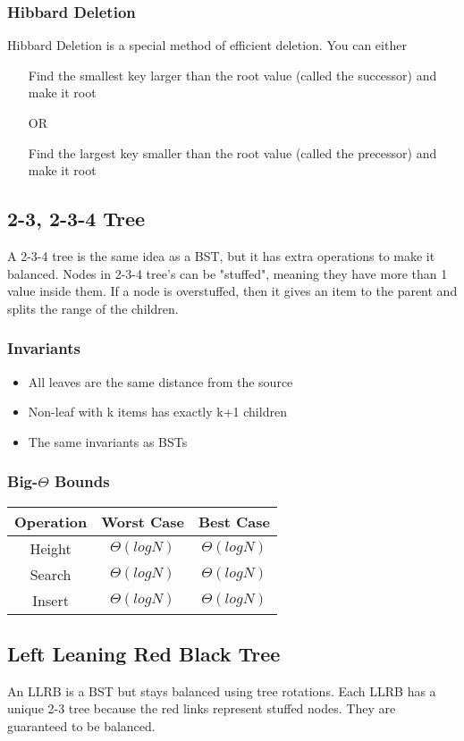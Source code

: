 \documentclass{article}
\begin{document}
\subsubsection{Hibbard Deletion}
Hibbard Deletion is a special method of efficient deletion.
You can either
\begin{itemize}
    \item[] Find the smallest key larger than the root value (called the successor) and make it root
    \item[OR ] 
    \item[] Find the largest key smaller than the root value (called the precessor) and make it root
\end{itemize}
\subsection{2-3, 2-3-4 Tree}
A 2-3-4 tree is the same idea as a BST, but it has extra operations to make it balanced.
Nodes in 2-3-4 tree's can be "stuffed", meaning they have more than 1 value inside them.
If a node is overstuffed, then it gives an item to the parent and splits the range of the children.
\subsubsection{Invariants}
\begin{itemize}
    \item All leaves are the same distance from the source
    \item Non-leaf with k items has exactly k+1 children
    \item The same invariants as BSTs
\end{itemize}
\subsubsection{Big-$\Theta$ Bounds}
\begin{center}
    \begin{tabular}{ c | c | c }
     Operation & Worst Case & Best Case\\
     \hline
     Height & $\Theta(log N)$ & $\Theta(log N)$ \\ 
     Search & $\Theta(log N)$ & $\Theta(log N)$ \\  
     Insert & $\Theta(log N)$ & $\Theta(log N)$  
    \end{tabular}
\end{center}
\subsection{Left Leaning Red Black Tree}
An LLRB is a BST but stays balanced using tree rotations. Each LLRB has a unique 2-3 tree because the red links represent stuffed nodes.
They are guaranteed to be balanced.
\end{document}
